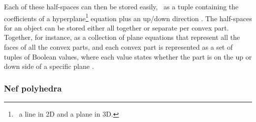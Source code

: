 Each of these half-spaces can then be stored easily, \eg\ as a tuple containing the coefficients of a hyperplane\footnote{\ie\ a line in 2D and a plane in 3D.} equation plus an up/down direction \citep{Naylor90,Thompson07}.
The half-spaces for an object can be stored either all together or separate per convex part.
Together, for instance, as a collection of plane equations that represent all the faces of all the convex parts, and each convex part is represented as a set of tuples of Boolean values, where each value states whether the part is on the up or down side of a specific plane \citep{Tammik07}.

\subsubsection{Nef polyhedra}

